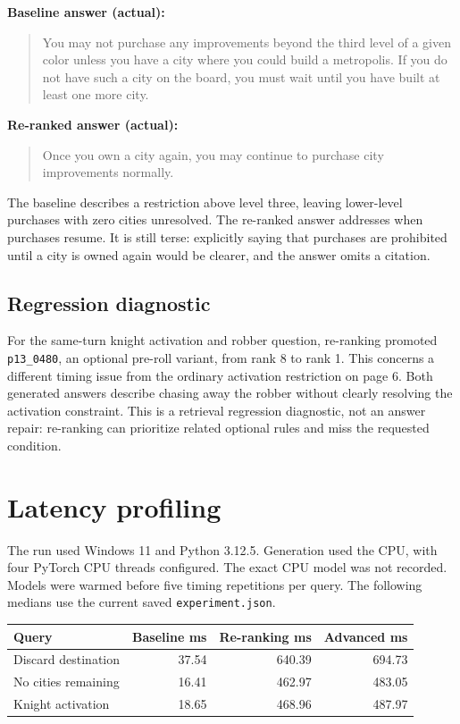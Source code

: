 \documentclass[10pt,a4paper]{article}
\newcommand{\answer}[1]{\begin{quote}\small #1\end{quote}}
\begin{document}
\textbf{Baseline answer (actual):}
\answer{You may not purchase any improvements beyond the third level of a given color unless you have a city where you could build a metropolis. If you do not have such a city on the board, you must wait until you have built at least one more city.}

\textbf{Re-ranked answer (actual):}
\answer{Once you own a city again, you may continue to purchase city improvements normally.}

The baseline describes a restriction above level three, leaving lower-level purchases with zero cities unresolved. The re-ranked answer addresses when purchases resume. It is still terse: explicitly saying that purchases are prohibited until a city is owned again would be clearer, and the answer omits a citation.

\subsection{Regression diagnostic}
For the same-turn knight activation and robber question, re-ranking promoted \texttt{p13\_0480}, an optional pre-roll variant, from rank 8 to rank 1. This concerns a different timing issue from the ordinary activation restriction on page 6. Both generated answers describe chasing away the robber without clearly resolving the activation constraint. This is a retrieval regression diagnostic, not an answer repair: re-ranking can prioritize related optional rules and miss the requested condition.

\section{Latency profiling}
The run used Windows 11 and Python 3.12.5. Generation used the CPU, with four PyTorch CPU threads configured. The exact CPU model was not recorded. Models were warmed before five timing repetitions per query. The following medians use the current saved \texttt{experiment.json}.

\begin{center}
\small
\begin{tabularx}{\linewidth}{@{}Xrrr@{}}
\toprule
Query & Baseline ms & Re-ranking ms & Advanced ms\\
\midrule
Discard destination & 37.54 & 640.39 & 694.73\\
No cities remaining & 16.41 & 462.97 & 483.05\\
Knight activation & 18.65 & 468.96 & 487.97\\
\bottomrule
\end{tabularx}
\end{center}
\end{document}
